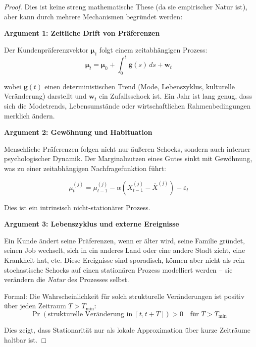 \documentclass[a4paper, 12pt, twoside, openright]{report}
\theoremstyle{definition}
\theoremstyle{definition}
\begin{document}
\begin{proof}
Dies ist keine streng mathematische These (da sie empirischer Natur ist), aber kann durch mehrere Mechanismen begründet werden:

\textbf{Argument 1: Zeitliche Drift von Präferenzen}

Der Kundenpräferenzvektor $\bm{\mu}_t$ folgt einem zeitabhängigen Prozess:
\begin{equation}
\bm{\mu}_t = \bm{\mu}_0 + \int_0^t \bm{g}(s) \, ds + \bm{w}_t
\end{equation}

wobei $\bm{g}(t)$ einen deterministischen Trend (Mode, Lebenszyklus, kulturelle Veränderung) darstellt und $\bm{w}_t$ ein Zufallsschock ist. Ein Jahr ist lang genug, dass sich die Modetrends, Lebensumstände oder wirtschaftlichen Rahmenbedingungen merklich ändern.

\textbf{Argument 2: Gewöhnung und Habituation}

Menschliche Präferenzen folgen nicht nur äußeren Schocks, sondern auch interner psychologischer Dynamik. Der Marginalnutzen eines Gutes sinkt mit Gewöhnung, was zu einer zeitabhängigen Nachfragefunktion führt:

\begin{equation}
\mu_t^{(j)} = \mu_{t-1}^{(j)} - \alpha (X_{t-1}^{(j)} - \overline{X}^{(j)}) + \varepsilon_t
\end{equation}

Dies ist ein intrinsisch nicht-stationärer Prozess.

\textbf{Argument 3: Lebenszyklus und externe Ereignisse}

Ein Kunde ändert seine Präferenzen, wenn er älter wird, seine Familie gründet, seinen Job wechselt, sich in ein anderes Land oder eine andere Stadt zieht, eine Krankheit hat, etc. Diese Ereignisse sind sporadisch, können aber nicht als rein stochastische Schocks auf einen stationären Prozess modelliert werden – sie verändern die \emph{Natur} des Prozesses selbst.

Formal: Die Wahrscheinlichkeit für solch strukturelle Veränderungen ist positiv über jeden Zeitraum $T > T_{\min}$:
\begin{equation}
\Pr(\text{strukturelle Veränderung in } [t, t+T]) > 0 \quad \text{für } T > T_{\min}
\end{equation}

Dies zeigt, dass Stationarität nur als lokale Approximation über kurze Zeiträume haltbar ist.
\end{proof}
\end{document}
